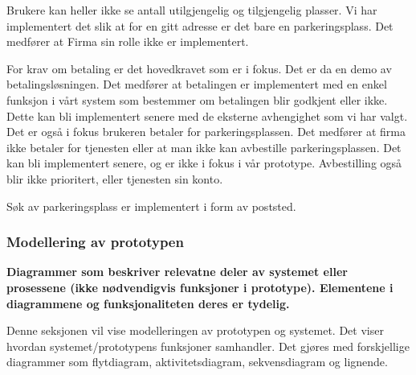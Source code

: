  Brukere kan heller ikke se antall utilgjengelig og tilgjengelig plasser. Vi har implementert det slik at for en gitt adresse er det bare en parkeringsplass. Det medfører at Firma sin rolle ikke er implementert.


For krav om betaling er det hovedkravet som er i fokus. Det er da en demo av betalingsløsningen. Det medfører at betalingen er implementert med en enkel funksjon i vårt system som bestemmer om betalingen blir godkjent eller ikke. Dette kan bli implementert senere med de eksterne avhengighet som vi har valgt.
Det er også i fokus brukeren betaler for parkeringsplassen. Det medfører at firma ikke betaler for tjenesten eller at man ikke kan avbestille parkeringsplassen. Det kan bli implementert senere, og er ikke i fokus i vår prototype. Avbestilling også blir ikke prioritert, eller tjenesten sin konto. 


Søk av parkeringsplass er implementert i form av poststed. 








\subsubsection{Modellering av prototypen}
\textbf{Diagrammer som beskriver relevatne deler av systemet eller prosessene (ikke nødvendigvis funksjoner i prototype). Elementene i diagrammene og funksjonaliteten deres er tydelig.}

Denne seksjonen vil vise modelleringen av prototypen og systemet. Det viser hvordan systemet/prototypens funksjoner samhandler. Det gjøres med forskjellige diagrammer som flytdiagram, aktivitetsdiagram, sekvensdiagram og lignende.
